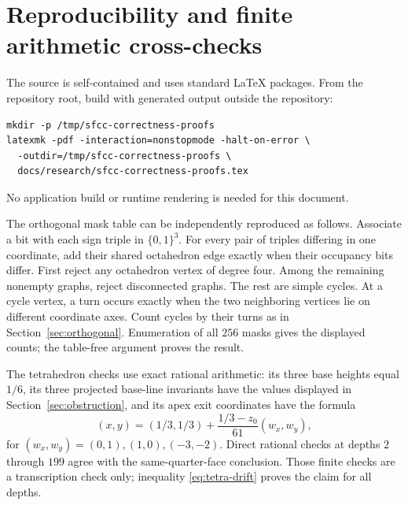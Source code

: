 \documentclass[11pt]{article}
\theoremstyle{definition}
\theoremstyle{remark}
\begin{document}
\appendix
\section{Reproducibility and finite arithmetic cross-checks}

The source is self-contained and uses standard LaTeX packages. From the
repository root, build with generated output outside the repository:
\begin{verbatim}
mkdir -p /tmp/sfcc-correctness-proofs
latexmk -pdf -interaction=nonstopmode -halt-on-error \
  -outdir=/tmp/sfcc-correctness-proofs \
  docs/research/sfcc-correctness-proofs.tex
\end{verbatim}
No application build or runtime rendering is needed for this document.

The orthogonal mask table can be independently reproduced as follows.
Associate a bit with each sign triple in $\{0,1\}^3$. For every pair
of triples differing in one coordinate, add their shared octahedron
edge exactly when their occupancy bits differ. First reject any
octahedron vertex of degree four. Among the remaining nonempty graphs,
reject disconnected graphs. The rest are simple cycles. At a cycle
vertex, a turn occurs exactly when the two neighboring vertices lie
on different coordinate axes. Count cycles by their turns as in
Section~\ref{sec:orthogonal}. Enumeration of all $256$ masks gives
the displayed counts; the table-free argument proves the result.

The tetrahedron checks use exact rational arithmetic: its three base
heights equal $1/6$, its three projected base-line invariants have the
values displayed in Section~\ref{sec:obstruction}, and its apex exit
coordinates have the formula
\[
  (x,y)=(1/3,1/3)+\frac{1/3-z_0}{61}(w_x,w_y),
\]
for $(w_x,w_y)=(0,1),(1,0),(-3,-2)$. Direct rational checks at depths
$2$ through $199$ agree with the same-quarter-face conclusion. Those
finite checks are a transcription check only; inequality
\eqref{eq:tetra-drift} proves the claim for all depths.
\end{document}
